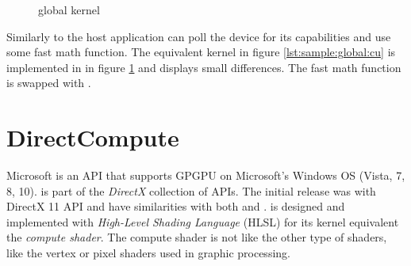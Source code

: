 \begin{figure}
	\centering
	\fbox{}
	\caption{{\OCL} global kernel}
	\label{lst:sample:global:ocl}	
\end{figure}

Similarly to {\CU} the host application can poll the device for its capabilities and use some fast math function. The equivalent {\CU} kernel in figure \ref{lst:sample:global:cu} is implemented in {\OCL} in figure \ref{lst:sample:global:ocl} and displays small differences. The fast math function  is swapped with .


\section{DirectCompute}

Microsoft {\DX} is an API that supports GPGPU on Microsoft's Windows OS (Vista, 7, 8, 10). {\DX} is part of the \emph{DirectX} collection of APIs. The initial release was with DirectX 11 API and have similarities with both {\CU} and {\OCL}. {\DX} is designed and implemented with \emph{High-Level Shading Language} (HLSL) for its kernel equivalent the \emph{compute shader}. The compute shader is not like the other type of shaders, like the vertex or pixel shaders used in graphic processing.

